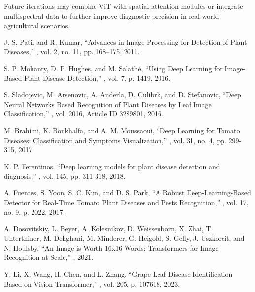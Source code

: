 \documentclass[preprint,12pt]{elsarticle}
\begin{document}
Future iterations may combine ViT with spatial attention modules or integrate multispectral data to further improve diagnostic precision in real-world agricultural scenarios.

\begin{thebibliography}{99}

J. S. Patil and R. Kumar,
\newblock ``Advances in Image Processing for Detection of Plant Diseases,''
, vol. 2, no. 11, pp. 168–175, 2011.

S. P. Mohanty, D. P. Hughes, and M. Salathé,
\newblock ``Using Deep Learning for Image-Based Plant Disease Detection,''
, vol. 7, p. 1419, 2016.

S. Sladojevic, M. Arsenovic, A. Anderla, D. Culibrk, and D. Stefanovic,
\newblock ``Deep Neural Networks Based Recognition of Plant Diseases by Leaf Image Classification,''
, vol. 2016, Article ID 3289801, 2016.

M. Brahimi, K. Boukhalfa, and A. M. Moussaoui,
\newblock ``Deep Learning for Tomato Diseases: Classification and Symptoms Visualization,''
, vol. 31, no. 4, pp. 299-315, 2017.

K. P. Ferentinos,
\newblock ``Deep learning models for plant disease detection and diagnosis,''
, vol. 145, pp. 311-318, 2018.

A. Fuentes, S. Yoon, S. C. Kim, and D. S. Park,
\newblock ``A Robust Deep-Learning-Based Detector for Real-Time Tomato Plant Diseases and Pests Recognition,''
, vol. 17, no. 9, p. 2022, 2017.

A. Dosovitskiy, L. Beyer, A. Kolesnikov, D. Weissenborn, X. Zhai, T. Unterthiner, M. Dehghani, M. Minderer, G. Heigold, S. Gelly, J. Uszkoreit, and N. Houlsby,
\newblock ``An Image is Worth 16x16 Words: Transformers for Image Recognition at Scale,''
, 2021.

Y. Li, X. Wang, H. Chen, and L. Zhang,
\newblock ``Grape Leaf Disease Identification Based on Vision Transformer,''
, vol. 205, p. 107618, 2023.


\end{thebibliography}
\end{document}
